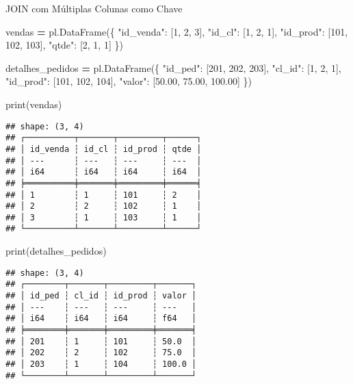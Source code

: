 \documentclass[
]{article}
\newenvironment{Shaded}{\begin{snugshade}}{\end{snugshade}}
\newcommand{\BuiltInTok}[1]{#1}
\newcommand{\DecValTok}[1]{\textcolor[rgb]{0.00,0.00,0.81}{#1}}
\newcommand{\FloatTok}[1]{\textcolor[rgb]{0.00,0.00,0.81}{#1}}
\newcommand{\NormalTok}[1]{#1}
\newcommand{\OperatorTok}[1]{\textcolor[rgb]{0.81,0.36,0.00}{\textbf{#1}}}
\newcommand{\StringTok}[1]{\textcolor[rgb]{0.31,0.60,0.02}{#1}}
\begin{document}
JOIN com Múltiplas Colunas como Chave

\begin{Shaded}
\begin{Highlighting}[]
\NormalTok{vendas }\OperatorTok{=}\NormalTok{ pl.DataFrame(\{}
    \StringTok{"id\_venda"}\NormalTok{: [}\DecValTok{1}\NormalTok{, }\DecValTok{2}\NormalTok{, }\DecValTok{3}\NormalTok{],}
    \StringTok{"id\_cl"}\NormalTok{: [}\DecValTok{1}\NormalTok{, }\DecValTok{2}\NormalTok{, }\DecValTok{1}\NormalTok{],}
    \StringTok{"id\_prod"}\NormalTok{: [}\DecValTok{101}\NormalTok{, }\DecValTok{102}\NormalTok{, }\DecValTok{103}\NormalTok{],}
    \StringTok{"qtde"}\NormalTok{: [}\DecValTok{2}\NormalTok{, }\DecValTok{1}\NormalTok{, }\DecValTok{1}\NormalTok{]}
\NormalTok{\})}

\NormalTok{detalhes\_pedidos }\OperatorTok{=}\NormalTok{ pl.DataFrame(\{}
    \StringTok{"id\_ped"}\NormalTok{: [}\DecValTok{201}\NormalTok{, }\DecValTok{202}\NormalTok{, }\DecValTok{203}\NormalTok{],}
    \StringTok{"cl\_id"}\NormalTok{: [}\DecValTok{1}\NormalTok{, }\DecValTok{2}\NormalTok{, }\DecValTok{1}\NormalTok{],}
    \StringTok{"id\_prod"}\NormalTok{: [}\DecValTok{101}\NormalTok{, }\DecValTok{102}\NormalTok{, }\DecValTok{104}\NormalTok{],}
    \StringTok{"valor"}\NormalTok{: [}\FloatTok{50.00}\NormalTok{, }\FloatTok{75.00}\NormalTok{, }\FloatTok{100.00}\NormalTok{]}
\NormalTok{\})}

\BuiltInTok{print}\NormalTok{(vendas)}
\end{Highlighting}
\end{Shaded}

\begin{verbatim}
## shape: (3, 4)
## ┌──────────┬───────┬─────────┬──────┐
## │ id_venda ┆ id_cl ┆ id_prod ┆ qtde │
## │ ---      ┆ ---   ┆ ---     ┆ ---  │
## │ i64      ┆ i64   ┆ i64     ┆ i64  │
## ╞══════════╪═══════╪═════════╪══════╡
## │ 1        ┆ 1     ┆ 101     ┆ 2    │
## │ 2        ┆ 2     ┆ 102     ┆ 1    │
## │ 3        ┆ 1     ┆ 103     ┆ 1    │
## └──────────┴───────┴─────────┴──────┘
\end{verbatim}

\begin{Shaded}
\begin{Highlighting}[]
\BuiltInTok{print}\NormalTok{(detalhes\_pedidos)}
\end{Highlighting}
\end{Shaded}

\begin{verbatim}
## shape: (3, 4)
## ┌────────┬───────┬─────────┬───────┐
## │ id_ped ┆ cl_id ┆ id_prod ┆ valor │
## │ ---    ┆ ---   ┆ ---     ┆ ---   │
## │ i64    ┆ i64   ┆ i64     ┆ f64   │
## ╞════════╪═══════╪═════════╪═══════╡
## │ 201    ┆ 1     ┆ 101     ┆ 50.0  │
## │ 202    ┆ 2     ┆ 102     ┆ 75.0  │
## │ 203    ┆ 1     ┆ 104     ┆ 100.0 │
## └────────┴───────┴─────────┴───────┘
\end{verbatim}
\end{document}
